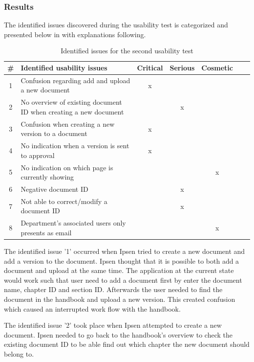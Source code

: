 \subsubsection*{Results}
The identified issues discovered during the usability test is categorized and presented below in  with explanations following.

\begin{table}[H]
	\begin{center}
	\begin{tabular}{| c | m{21em} | c | c | c | c | c |}
		\hline
		\# & \textbf{Identified usability issues} & Critical  & Serious & Cosmetic \\
		\hline
		 1 & Confusion regarding add and upload a new document   & x &  &  \\
		\hline
		 2 & No overview of existing document ID when creating a new document &  & x & \\
		\hline
		 3 & Confusion when creating a new version to a document & x & &  \\
		\hline
		4 & No indication when a version is sent to approval & x & & \\
		\hline
		5 & No indication on which page is currently showing &  &  & x \\
		\hline
		6 & Negative document ID &  & x & \\
		\hline
		7 & Not able to correct/modify a document ID & & x &  \\
		\hline
		8 & Department's associated users only presents as email &  &  & x \\
		\hline
	\end{tabular}
	\end{center}
	\caption{Identified issues for the second usability test}\label{tab:utest2}
\end{table}
The identified issue '1' occurred when Ipsen tried to create a new document and add a version to the document.
Ipsen thought that it is possible to both add a document and upload at the same time.
The application at the current state would work such that user need to add a document first by enter the document name, chapter ID and section ID. Afterwards the user needed to find the document in the handbook and upload a new version.
This created confusion which caused an interrupted work flow with the handbook.

The identified issue '2' took place when Ipsen attempted to create a new document.
Ipsen needed to go back to the handbook's overview to check the existing document ID to be able find out which chapter the new document should belong to.

